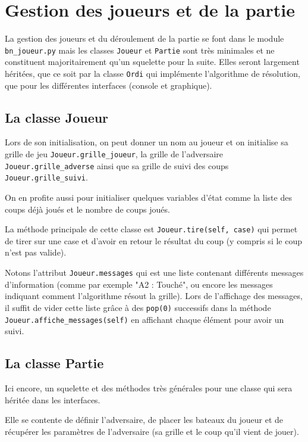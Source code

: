 \chapter{Gestion des joueurs et de la partie}\label{chap_joueurs}

La gestion des joueurs et du déroulement de la partie se font dans le module \texttt{bn\_joueur.py} mais les classes \texttt{Joueur} et \texttt{Partie} sont très minimales et ne constituent majoritairement qu'un squelette pour la suite. Elles seront largement héritées, que ce soit par la classe \texttt{Ordi} qui implémente l'algorithme de résolution, que pour les différentes interfaces (console et graphique).

\section{La classe Joueur}
Lors de son initialisation, on peut donner un nom au joueur et on initialise sa grille de jeu \texttt{Joueur.grille\_joueur}, la grille de l'adversaire \texttt{Joueur.grille\_adverse} ainsi que sa grille de suivi des coups \texttt{Joueur.grille\_suivi}.

On en profite aussi pour initialiser quelques variables d'état comme la liste des coups déjà joués et le nombre de coups joués.

La méthode principale de cette classe est \texttt{Joueur.tire(self, case)} qui permet de tirer sur une case et d'avoir en retour le résultat du coup (y compris si le coup n'est pas valide).

\medskip

Notons l'attribut \texttt{Joueur.messages} qui est une liste contenant différents messages d'information (comme par exemple "A2 : Touché", ou encore les messages indiquant comment l'algorithme résout la grille). Lors de l'affichage des messages, il suffit de vider cette liste grâce à des \texttt{pop(0)} successifs dans la méthode \texttt{Joueur.affiche\_messages(self)} en affichant chaque élément pour avoir un suivi.

\section{La classe Partie}
Ici encore, un squelette et des méthodes très générales pour une classe qui sera héritée dans les interfaces.

Elle se contente de définir l'adversaire, de placer les bateaux du joueur et de récupérer les paramètres de l'adversaire (sa grille et le coup qu'il vient de jouer).

